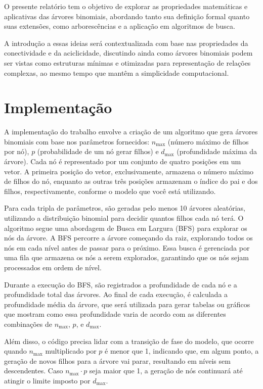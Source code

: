 \documentclass[12pt, a4paper]{scrreprt}
\begin{document}
O presente relatório tem o objetivo de explorar as propriedades matemáticas e aplicativas das árvores binomiais, abordando tanto sua definição formal quanto suas extensões, como arborescências e a aplicação em algoritmos de busca.

A introdução a essas ideias será contextualizada com base nas propriedades da conectividade e da aciclicidade, discutindo ainda como árvores binomiais podem ser vistas como estruturas mínimas e otimizadas para representação de relações complexas, ao mesmo tempo que mantêm a simplicidade computacional.

\chapter{Implementação}
A implementação do trabalho envolve a criação de um algoritmo que gera árvores binomiais com base nos parâmetros fornecidos: \( n_{\text{max}} \) (número máximo de filhos por nó), \( p \) (probabilidade de um nó gerar filhos) e \( d_{\text{max}} \) (profundidade máxima da árvore). Cada nó é representado por um conjunto de quatro posições em um vetor. A primeira posição do vetor, exclusivamente, armazena o número máximo de filhos do nó, enquanto as outras três posições armazenam o índice do pai e dos filhos, respectivamente, conforme o modelo que você está utilizando.

Para cada tripla de parâmetros, são geradas pelo menos 10 árvores aleatórias, utilizando a distribuição binomial para decidir quantos filhos cada nó terá. O algoritmo segue uma abordagem de Busca em Largura (BFS) para explorar os nós da árvore. A BFS percorre a árvore começando da raiz, explorando todos os nós em cada nível antes de passar para o próximo. Essa busca é gerenciada por uma fila que armazena os nós a serem explorados, garantindo que os nós sejam processados em ordem de nível.

Durante a execução do BFS, são registrados a profundidade de cada nó e a profundidade total das árvores. Ao final de cada execução, é calculada a profundidade média da árvore, que será utilizada para gerar tabelas ou gráficos que mostram como essa profundidade varia de acordo com as diferentes combinações de \( n_{\text{max}} \), \( p \), e \( d_{\text{max}} \).

Além disso, o código precisa lidar com a transição de fase do modelo, que ocorre quando \( n_{\text{max}} \) multiplicado por \( p \) é menor que 1, indicando que, em algum ponto, a geração de novos filhos para a árvore vai parar, resultando em níveis sem descendentes. Caso \( n_{\text{max}} \cdot p \) seja maior que 1, a geração de nós continuará até atingir o limite imposto por \( d_{\text{max}} \).
\end{document}
